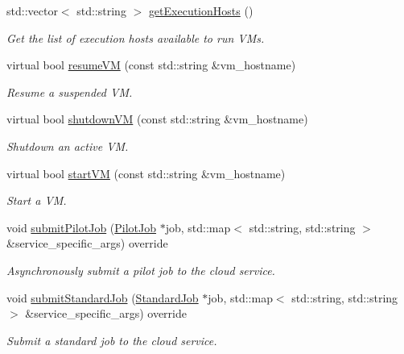 \begin{DoxyCompactItemize}
std\+::vector$<$ std\+::string $>$ \hyperlink{classwrench_1_1_cloud_service_a6a902accf0e349e2f907f9903243d6c4}{get\+Execution\+Hosts} ()
\begin{DoxyCompactList}\small\item\em Get the list of execution hosts available to run V\+Ms. \end{DoxyCompactList}\item 
virtual bool \hyperlink{classwrench_1_1_cloud_service_a7f6214c3b2b017d00812bf0a425202fc}{resume\+VM} (const std\+::string \&vm\+\_\+hostname)
\begin{DoxyCompactList}\small\item\em Resume a suspended VM. \end{DoxyCompactList}\item 
virtual bool \hyperlink{classwrench_1_1_cloud_service_ac9ee0c086c699c0c690be88abc7a0f9c}{shutdown\+VM} (const std\+::string \&vm\+\_\+hostname)
\begin{DoxyCompactList}\small\item\em Shutdown an active VM. \end{DoxyCompactList}\item 
virtual bool \hyperlink{classwrench_1_1_cloud_service_a1a074e4259a9f1e786dab385ccf39e62}{start\+VM} (const std\+::string \&vm\+\_\+hostname)
\begin{DoxyCompactList}\small\item\em Start a VM. \end{DoxyCompactList}\item 
void \hyperlink{classwrench_1_1_cloud_service_a06e8a8736b03e38464484aa110625ca3}{submit\+Pilot\+Job} (\hyperlink{classwrench_1_1_pilot_job}{Pilot\+Job} $\ast$job, std\+::map$<$ std\+::string, std\+::string $>$ \&service\+\_\+specific\+\_\+args) override
\begin{DoxyCompactList}\small\item\em Asynchronously submit a pilot job to the cloud service. \end{DoxyCompactList}\item 
void \hyperlink{classwrench_1_1_cloud_service_ae51ffa7f8e75d1834a193b91cb376b9a}{submit\+Standard\+Job} (\hyperlink{classwrench_1_1_standard_job}{Standard\+Job} $\ast$job, std\+::map$<$ std\+::string, std\+::string $>$ \&service\+\_\+specific\+\_\+args) override
\begin{DoxyCompactList}\small\item\em Submit a standard job to the cloud service. \end{DoxyCompactList}\item 

\end{DoxyCompactItemize}
